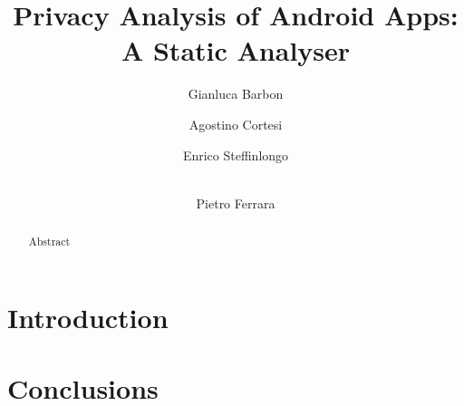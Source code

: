 \documentclass{llncs}
\begin{document}
\mainmatter

\title{Privacy Analysis of Android Apps:\\ A Static Analyser}

\author{ Gianluca Barbon  \and Agostino Cortesi \and Enrico Steffinlongo \and  \\ Pietro Ferrara 
}



\maketitle


\begin{abstract}
Abstract 
\end{abstract}

\section{Introduction}

\section{Conclusions}

%
%
\end{document}
